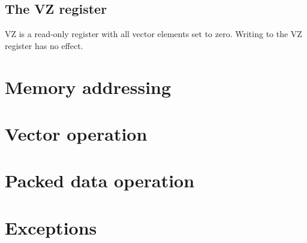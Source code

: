 \subsection{The VZ register}

VZ is a read-only register with all vector elements set to zero. Writing to the
VZ register has no effect.

\section{Memory addressing}

\tbd

\section{Vector operation}

\tbd

\section{Packed data operation}

\tbd

\section{Exceptions}

\tbd
